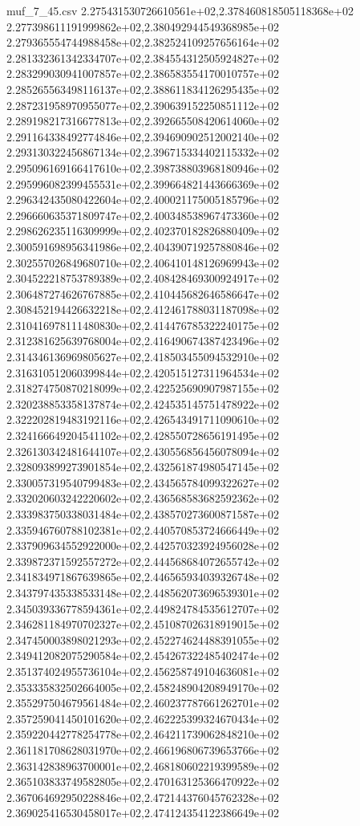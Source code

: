\begin{filecontents*}{muf_7_45.csv}
2.275431530726610561e+02,2.378460818505118368e+02
2.277398611191999862e+02,2.380492944549368985e+02
2.279365554744988458e+02,2.382524109257656164e+02
2.281332361342334707e+02,2.384554312505924827e+02
2.283299030941007857e+02,2.386583554170010757e+02
2.285265563498116137e+02,2.388611834126295435e+02
2.287231958970955077e+02,2.390639152250851112e+02
2.289198217316677813e+02,2.392665508420614060e+02
2.291164338492774846e+02,2.394690902512002140e+02
2.293130322456867134e+02,2.396715334402115332e+02
2.295096169166417610e+02,2.398738803968180946e+02
2.295996082399455531e+02,2.399664821443666369e+02
2.296342435080422604e+02,2.400021175005185796e+02
2.296660635371809747e+02,2.400348538967473360e+02
2.298626235116309999e+02,2.402370182826880409e+02
2.300591698956341986e+02,2.404390719257880846e+02
2.302557026849680710e+02,2.406410148126969943e+02
2.304522218753789389e+02,2.408428469300924917e+02
2.306487274626767885e+02,2.410445682646586647e+02
2.308452194426632218e+02,2.412461788031187098e+02
2.310416978111480830e+02,2.414476785322240175e+02
2.312381625639768004e+02,2.416490674387423496e+02
2.314346136969805627e+02,2.418503455094532910e+02
2.316310512060399844e+02,2.420515127311964534e+02
2.318274750870218099e+02,2.422525690907987155e+02
2.320238853358137874e+02,2.424535145751478922e+02
2.322202819483192116e+02,2.426543491711090610e+02
2.324166649204541102e+02,2.428550728656191495e+02
2.326130342481644107e+02,2.430556856456078094e+02
2.328093899273901854e+02,2.432561874980547145e+02
2.330057319540799483e+02,2.434565784099322627e+02
2.332020603242220602e+02,2.436568583682592362e+02
2.333983750338031484e+02,2.438570273600871587e+02
2.335946760788102381e+02,2.440570853724666449e+02
2.337909634552922000e+02,2.442570323924956028e+02
2.339872371592557272e+02,2.444568684072655742e+02
2.341834971867639865e+02,2.446565934039326748e+02
2.343797435338533148e+02,2.448562073696539301e+02
2.345039336778594361e+02,2.449824784535612707e+02
2.346281184970702327e+02,2.451087026318919015e+02
2.347450003898021293e+02,2.452274624488391055e+02
2.349412082075290584e+02,2.454267322485402474e+02
2.351374024955736104e+02,2.456258749104636081e+02
2.353335832502664005e+02,2.458248904208949170e+02
2.355297504679561484e+02,2.460237787661262701e+02
2.357259041450101620e+02,2.462225399324670434e+02
2.359220442778254778e+02,2.464211739062848210e+02
2.361181708628031970e+02,2.466196806739653766e+02
2.363142838963700001e+02,2.468180602219399589e+02
2.365103833749582805e+02,2.470163125366470922e+02
2.367064692950228846e+02,2.472144376045762328e+02
2.369025416530458017e+02,2.474124354122386649e+02

\end{filecontents*}
